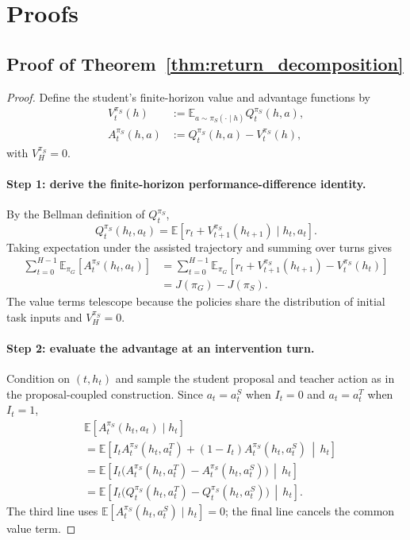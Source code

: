 \newpage
\section{Proofs}
\label{app:theory_proofs}

\subsection{Proof of Theorem~\ref{thm:return_decomposition}}
\label{app:proof_return_improvement}

\begin{proof}
Define the student's finite-horizon value and advantage functions by
\begin{align*}
V_t^{\pi_S}(h)
&:=\mathbb E_{a\sim\pi_S(\cdot\mid h)}Q_t^{\pi_S}(h,a),\\
A_t^{\pi_S}(h,a)
&:=Q_t^{\pi_S}(h,a)-V_t^{\pi_S}(h),
\end{align*}
with $V_H^{\pi_S}=0$.

\paragraph{Step 1: derive the finite-horizon performance-difference identity.}
By the Bellman definition of $Q_t^{\pi_S}$,
\[
Q_t^{\pi_S}(h_t,a_t)
=\mathbb E\!\left[r_t+V_{t+1}^{\pi_S}(h_{t+1})
\mid h_t,a_t\right].
\]
Taking expectation under the assisted trajectory and summing over turns gives
\begin{align*}
\sum_{t=0}^{H-1}\mathbb E_{\pi_G}\!\left[A_t^{\pi_S}(h_t,a_t)\right]
&=\sum_{t=0}^{H-1}\mathbb E_{\pi_G}\!\left[
r_t+V_{t+1}^{\pi_S}(h_{t+1})-V_t^{\pi_S}(h_t)\right]\\
&=J(\pi_G)-J(\pi_S).
\end{align*}
The value terms telescope because the policies share the distribution of initial task inputs and $V_H^{\pi_S}=0$.

\paragraph{Step 2: evaluate the advantage at an intervention turn.}
Condition on $(t,h_t)$ and sample the student proposal and teacher action as in the proposal-coupled construction. Since $a_t=a_t^S$ when $I_t=0$ and $a_t=a_t^T$ when $I_t=1$,
\begin{align*}
&\mathbb E\!\left[A_t^{\pi_S}(h_t,a_t)\mid h_t\right]\\
&=\mathbb E\!\left[
I_tA_t^{\pi_S}(h_t,a_t^T)+(1-I_t)A_t^{\pi_S}(h_t,a_t^S)
\,\middle|\,h_t\right]\\
&=\mathbb E\!\left[
I_t\bigl(A_t^{\pi_S}(h_t,a_t^T)-A_t^{\pi_S}(h_t,a_t^S)\bigr)
\,\middle|\,h_t\right]\\
&=\mathbb E\!\left[
I_t\bigl(Q_t^{\pi_S}(h_t,a_t^T)-Q_t^{\pi_S}(h_t,a_t^S)\bigr)
\,\middle|\,h_t\right].
\end{align*}
The third line uses $\mathbb E[A_t^{\pi_S}(h_t,a_t^S)\mid h_t]=0$; the final line cancels the common value term.


\end{proof}
